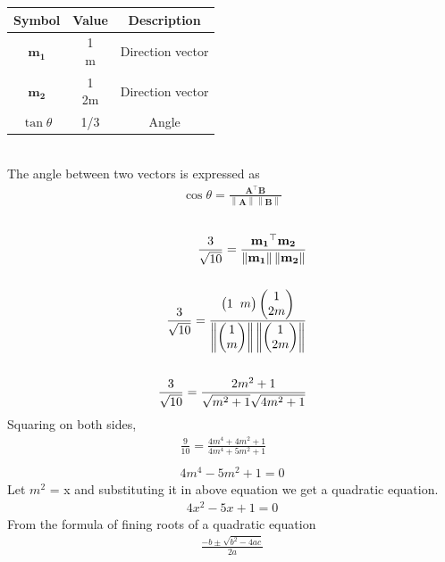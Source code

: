 \documentclass[10pt,a4paper]{report}
\newcommand{\myvec}[1]{\ensuremath{\begin{pmatrix}#1\end{pmatrix}}}
\let\vec\mathbf
\providecommand{\norm}[1]{\left\lVert#1\right\rVert}
\let\vec\mathbf
\begin{document}
\begin{multicols}{2}
\begin{tabular}{|c|c|c|}
	\hline
	\textbf{Symbol}&\textbf{Value}&\textbf{Description}\\
	\hline
	$\vec{m_1}$ &\myvec{1\\m}& Direction vector\\
	\hline
    $\vec{m_2}$ &\myvec{1\\2m}&Direction vector\\
	\hline
    $\tan\theta$ &1/3& Angle\\
	\hline
\end{tabular}
\\
\vspace{10cm}
The angle between two vectors is expressed as
\\ \vspace{1mm}
\begin{align}
\cos \theta = \frac{{\textbf{A}}^\top \textbf{B}}{\norm{\textbf{A}}\norm{\textbf{B}}}
\end{align} 
\\
\begin{align}
\frac{3}{\sqrt{10}} = \frac{\vec{m_1}^\top \vec{m_2}}{\norm{\vec{m_1}}\norm{\vec{m_2}}}
\\
\\
\frac{3}{\sqrt{10}} = \frac{\myvec{1 \hspace{2mm} m}\myvec{1 \\ 2m}}{\norm{\myvec{1\\m}}\norm{\myvec{1\\2m}}}
\\
\\
\frac{3}{\sqrt{10}} = \frac{2m^2 +1}{\sqrt{m^2 + 1}\sqrt{4m^2 + 1}}
\end{align}
\vspace{2mm}
Squaring on both sides,
\begin{align}
\frac{9}{10}=\frac{4m^4 + 4m^2 +1}{4m^4 + 5m^2 +1}
\\
\\
4m^4 - 5m^2 +1 = 0
\end{align}
Let $m^2$ = x and substituting it in above equation we get a quadratic equation.
\begin{align}
	4x^2 -5x +1 = 0
\end{align}
From the formula of fining roots of a quadratic equation
\begin{align}
	\frac{-b\pm \sqrt{b^2 - 4ac}}{2a}
	\\
	\\

\end{align}
\end{multicols}
\end{document}
